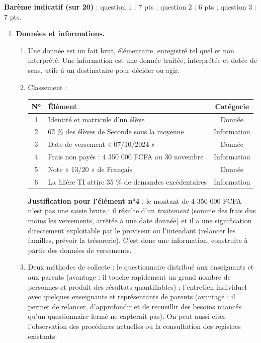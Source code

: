 \documentclass[11pt]{article}
\newcommand{\cle}[1]{{\popxbold\color{popdark}#1}}
\begin{document}
\begin{corrige}
\textbf{Barème indicatif (sur 20)} : question 1 : 7 pts ; question 2 : 6 pts ; question 3 : 7 pts.

\begin{enumerate}
    \item \textbf{Données et informations.}
    \begin{enumerate}
        \item Une \cle{donnée} est un fait brut, élémentaire, enregistré tel quel et non interprété. Une \cle{information} est une donnée traitée, interprétée et dotée de sens, utile à un destinataire pour décider ou agir.
        \item Classement :
\begin{center}
\begin{tabularx}{\linewidth}{|c|X|c|}
\hline
\rowcolor{popblueL} \textbf{N°} & \textbf{Élément} & \textbf{Catégorie} \\
\hline
1 & Identité et matricule d'un élève & Donnée \\
\hline
2 & 62 \% des élèves de Seconde sous la moyenne & Information \\
\hline
3 & Date de versement « 07/10/2024 » & Donnée \\
\hline
4 & Frais non payés : 4 350 000 FCFA au 30 novembre & Information \\
\hline
5 & Note « 13/20 » de Français & Donnée \\
\hline
6 & La filière TI attire 35 \% de demandes excédentaires & Information \\
\hline
\end{tabularx}
\end{center}
        \textbf{Justification pour l'élément n°4} : le montant de 4 350 000 FCFA n'est pas une saisie brute : il résulte d'un \emph{traitement} (somme des frais dus moins les versements, arrêtée à une date donnée) et il a une signification directement exploitable par le proviseur ou l'intendant (relancer les familles, prévoir la trésorerie). C'est donc une information, construite à partir des données de versements.
        \item Deux méthodes de collecte : le \cle{questionnaire} distribué aux enseignants et aux parents (avantage : il touche rapidement un grand nombre de personnes et produit des résultats quantifiables) ; l'\cle{entretien} individuel avec quelques enseignants et représentants de parents (avantage : il permet de relancer, d'approfondir et de recueillir des besoins nuancés qu'un questionnaire fermé ne capterait pas). On peut aussi citer l'observation des procédures actuelles ou la consultation des registres existants.

\end{enumerate}
\end{enumerate}
\end{corrige}
\end{document}
